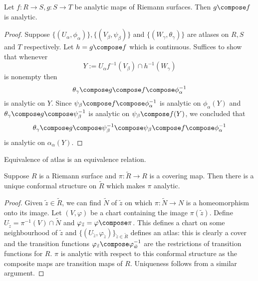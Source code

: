 \documentclass[a4paper]{article}
\begin{document}
\begin{proposition}
  Let \(f: R \to S, g: S \to T\) be analytic maps of Riemann surfaces. Then \(g \compose f\) is analytic.
\end{proposition}

\begin{proof}
  Suppose \(\{(U_\alpha, \phi_\alpha)\}, \{(V_\beta, \psi_\beta)\}\) and \(\{(W_\gamma, \theta_\gamma)\}\) are atlases on \(R, S\) and \(T\) respectively. Let \(h = g \compose f\) which is continuous. Suffices to show that whenever
  \[
    Y := U_\alpha f^{-1}(V_\beta) \cap h^{-1} (W_\gamma)
  \]
  is nonempty then
  \[
    \theta_\gamma \compose g \compose f \compose \phi_\alpha^{-1}
  \]
  is analytic on \(Y\). Since \(\psi_\beta \compose f \compose \phi_\alpha^{-1}\) is analytic on \(\phi_\alpha(Y)\) and \(\theta_\gamma \compose g \compose \psi_\beta^{-1}\) is analytic on \(\psi_\beta \compose f (Y)\), we concluded that
  \[
    \theta_\gamma \compose g \compose \psi_\beta^{-1} \compose \psi_\beta \compose f \compose \phi_\alpha^{-1}
  \]
  is analytic on \(\alpha_\alpha(Y)\).
\end{proof}

\begin{corollary}
  Equivalence of atlas is an equivalence relation.
\end{corollary}

\begin{proposition}
  Suppose \(R\) is a Riemann surface and \(\pi: \tilde R \to R\) is a covering map. Then there is a unique conformal structure on \(\tilde R\) which makes \(\pi\) analytic.
\end{proposition}

\begin{proof}
  Given \(\tilde z \in \tilde R\), we can find \(\tilde N\) of \(\tilde z\) on which \(\pi: \tilde N \to N\) is a homeomorphism onto its image. Let \((V, \varphi)\) be a chart containing the image \(\pi(\tilde z)\). Define \(U_{\tilde z} = \pi^{-1}(V) \cap \tilde N\) and \(\varphi_{\tilde z} = \varphi \compose \pi\). This defines a chart on some neighbourhood of \(\tilde z\) and \(\{(U_{\tilde z}, \varphi_{\tilde z})\}_{\tilde z \in \tilde R}\) defines an atlas: this is clearly a cover and the transition functions \(\varphi_{\tilde z} \compose \varphi_{\tilde w}^{-1}\) are the restrictions of transition functions for \(R\). \(\pi\) is analytic with respect to this conformal structure as the composite maps are transition maps of \(R\). Uniqueness follows from a similar argument.
\end{proof}
\end{document}
